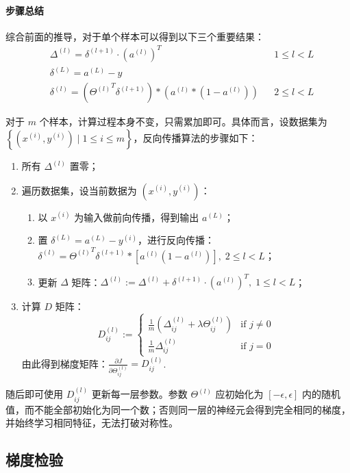 \paragraph{步骤总结}

综合前面的推导，对于单个样本可以得到以下三个重要结果：
\begin{align*}
&\Delta^{(l)}=\delta^{(l+1)}\cdot(a^{(l)})^T&&1\leqslant l<L\\
&\delta^{(L)}=a^{(L)}-y\\
&\delta^{(l)}=\left({\Theta^{(l)}}^T\delta^{(l+1)}\right)*\left(a^{(l)}*(1-a^{(l)})\right)&&2\leqslant l<L
\end{align*}

对于 $m$ 个样本，计算过程本身不变，只需累加即可。具体而言，设数据集为 $\left\{(x^{(i)},y^{(i)})\mid 1\leqslant i\leqslant m\right\}$，反向传播算法的步骤如下：

\begin{enumerate}
    \item 所有 $\Delta^{(l)}$ 置零；
    \item 遍历数据集，设当前数据为 $(x^{(i)},y^{(i)})$：
        \begin{enumerate}
            \item 以 $x^{(i)}$ 为输入做前向传播，得到输出 $a^{(L)}$；
            \item 置 $\delta^{(L)}=a^{(L)}-y^{(i)}$，进行反向传播：$\delta^{(l)}={\Theta^{(l)}}^T\delta^{(l+1)}*\left[a^{(l)}(1-a^{(l)})\right],\;2\leqslant l<L$；
            \item 更新 $\Delta$ 矩阵：$\Delta^{(l)}:=\Delta^{(l)}+\delta^{(l+1)}\cdot(a^{(l)})^T,\;1\leqslant l<L$；
        \end{enumerate}
    \item 计算 $D$ 矩阵：
       \[
       D_{ij}^{(l)}:=\begin{cases}
       \frac{1}{m}\left(\Delta_{ij}^{(l)}+\lambda\Theta_{ij}^{(l)}\right)&\text{if }j\neq0\\
       \frac{1}{m}\Delta_{ij}^{(l)}&\text{if }j=0
       \end{cases}
       \]
       由此得到梯度矩阵：$\frac{\partial J}{\partial \Theta_{ij}^{(l)}}=D^{(l)}_{ij}$. 
\end{enumerate}

随后即可使用 $D_{ij}^{(l)}$ 更新每一层参数。参数 $\Theta^{(l)}$ 应初始化为 $[-\epsilon,\epsilon]$ 内的随机值，而不能全部初始化为同一个数；否则同一层的神经元会得到完全相同的梯度，并始终学习相同特征，无法打破对称性。


\subsection{梯度检验}

